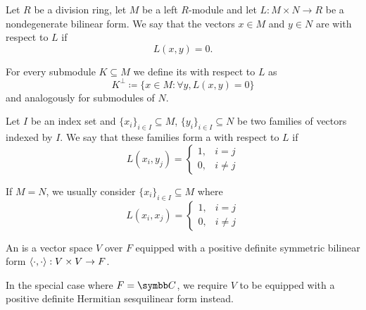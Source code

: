 \begin{definition}\label{def:orthogonality}
  Let \( R \) be a division ring, let \( M \) be a left \( R \)-module and let \( L: M \times N \to R \) be a nondegenerate bilinear form. We say that the vectors \( x \in M \) and \( y \in N \) are  with respect to \( L \) if
  \begin{equation*}
    L(x, y) = 0.
  \end{equation*}

  For every submodule \( K \subseteq M \) we define its  with respect to \( L \) as
  \begin{equation*}
    K^\perp \coloneqq \{ x \in M \colon \forall y, L(x, y) = 0 \}
  \end{equation*}
  and analogously for submodules of \( N \).

  Let \( I \) be an index set and \( \{ x_i \}_{i \in I} \subseteq M \), \( \{ y_i \}_{i \in I} \subseteq N \) be two families of vectors indexed by \( I \). We say that these families form a  with respect to \( L \) if
  \begin{equation*}
    L(x_i, y_j) = \begin{cases}
      1, &i = j \\
      0, &i \neq j
    \end{cases}
  \end{equation*}

  If \( M = N \), we usually consider  \( \{ x_i \}_{i \in I} \subseteq M \) where
  \begin{equation*}
    L(x_i, x_j) = \begin{cases}
      1, &i = j \\
      0, &i \neq j
    \end{cases}
  \end{equation*}
\end{definition}

\begin{definition}\label{def:inner_product_space}
  An  is a vector space \( V \) over \( F \) equipped with a positive definite symmetric bilinear form \( \left\langle \cdot, \cdot \right\rangle: V \times V \to F \).

  In the special case where \( F = \C \), we require \( V \) to be equipped with a positive definite Hermitian sesquilinear form instead.
\end{definition}

